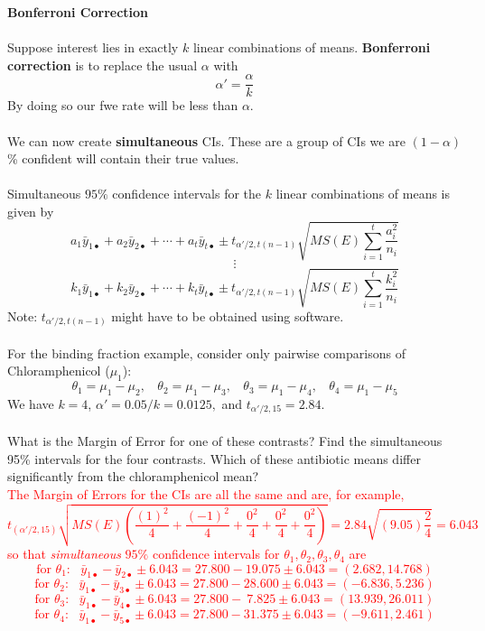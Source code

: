 \newpage

\textbf{Bonferroni Correction}\\~\\
Suppose interest lies in exactly $k$ linear combinations of means.  \textbf{Bonferroni correction} is to replace the usual $\alpha$ with
$$ \alpha'=\frac{\alpha}{k}$$
By doing so our fwe rate will be less than $\alpha$.\\~\\
We can now create \textbf{simultaneous} CIs.  These are a group of CIs we are $(1-\alpha)$\% confident will  contain their true values.\\~\\
Simultaneous $95\%$ confidence intervals for the $k$ linear combinations of means is given by
$$ a_1 \bar{y}_{1\bullet} + a_2 \bar{y}_{2\bullet} + \cdots + a_t \bar{y}_{t\bullet} \pm t_{\alpha'/2,t(n-1)}\sqrt{MS(E) \sum_{i=1}^{t} \frac{a_i^2}{n_i}} $$
$$\vdots$$ 
$$ k_1 \bar{y}_{1\bullet} + k_2 \bar{y}_{2\bullet} + \cdots + k_t \bar{y}_{t\bullet} \pm t_{\alpha'/2,t(n-1)}\sqrt{MS(E) \sum_{i=1}^{t} \frac{k_i^2}{n_i}} $$
Note: $t_{\alpha'/2,t(n-1)}$ might have to be obtained using software.\\~\\
For the binding fraction example, consider only pairwise comparisons of Chloramphenicol ($\mu_1$):
$$\theta_1 = \mu_1-\mu_2, ~~~~\theta_2 = \mu_1-\mu_3, ~~~~\theta_3 = \mu_1-\mu_4, ~~~~\theta_4 = \mu_1-\mu_5$$
We have $k=4$, $ \alpha'=0.05/k=0.0125,$ and $t_{\alpha'/2,15} = 2.84$.\\~\\
What is the Margin of Error for one of these contrasts?  Find the simultaneous 95\% intervals for the four contrasts.  Which of these antibiotic means differ significantly from the chloramphenicol mean?\\
\textcolor{red}{The Margin of Errors for the CIs are all the same and are, for example,  
$$t_{(\alpha'/2,15)}\sqrt{MS(E) \left(\frac{(1)^2}{4} + \frac{(-1)^2}{4}+\frac{0^2}{4} + \frac{0^2}{4} +\frac{0^2}{4}\right)} = 2.84\sqrt{(9.05)\frac{2}{4}} = 6.043 $$
so that \textit{simultaneous} $95\%$ confidence intervals for $\theta_1,\theta_2,\theta_3,\theta_4$ are
$$\mbox{for }\theta_1:~~~\bar{y}_{1\bullet}-\bar{y}_{2\bullet} \pm 6.043 = 27.800-19.075 \pm 6.043 = (2.682, 14.768)$$
$$\mbox{for }\theta_2:~~~\bar{y}_{1\bullet}-\bar{y}_{3\bullet} \pm 6.043 = 27.800-28.600 \pm 6.043 = (-6.836, 5.236)$$
$$\mbox{for }\theta_3:~~~\bar{y}_{1\bullet}-\bar{y}_{4\bullet} \pm 6.043 = 27.800-~7.825 \pm 6.043 = (13.939, 26.011)$$
$$\mbox{for }\theta_4:~~~\bar{y}_{1\bullet}-\bar{y}_{5\bullet} \pm 6.043 = 27.800-31.375 \pm 6.043 = (-9.611, 2.461)$$
}


